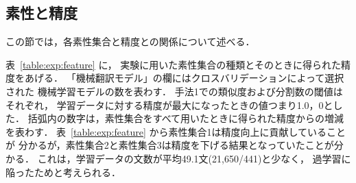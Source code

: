 \subsection{素性と精度}
\label{sec:feature_sets_and_accuracy}

この節では，各素性集合と精度との関係について述べる．

表~\ref{table:exp:feature} に，
実験に用いた素性集合の種類とそのときに得られた精度をあげる．
「機械翻訳モデル」の欄にはクロスバリデーションによって選択された
機械学習モデルの数を表わす．
手法1での類似度および分割数の閾値はそれぞれ，
学習データに対する精度が最大になったときの値つまり1.0，0とした．
括弧内の数字は，素性集合をすべて用いたときに得られた精度からの増減を表わす．
表~\ref{table:exp:feature} から素性集合1は精度向上に貢献していることが
分かるが，素性集合2と素性集合3は精度を下げる結果となっていたことが分かる．
これは，学習データの文数が平均49.1文(21,650/441)と少なく，
過学習に陥ったためと考えられる．

